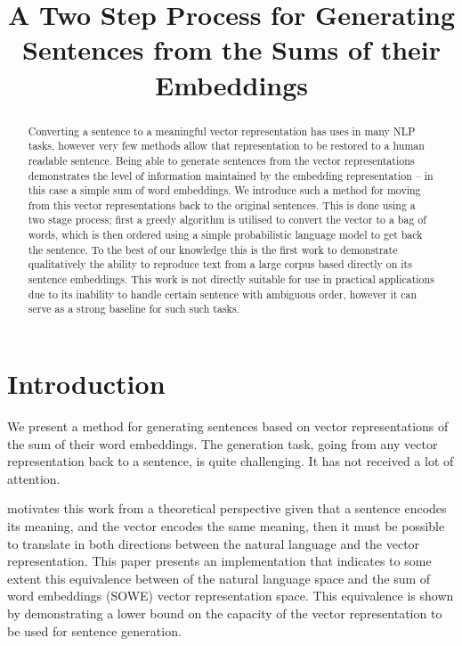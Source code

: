 \documentclass[11pt]{article}
\title{A Two Step Process for Generating Sentences from the Sums of their Embeddings}
\author{}
\theoremstyle{plain}
\theoremstyle{definition}
\newcommand{\textcite}{\protect\newcite}
\begin{document}
\maketitle

\begin{abstract}

	
Converting a sentence to a meaningful vector representation has uses in many NLP tasks, however very few methods allow that representation to be restored to a human readable sentence. Being able to generate sentences from the vector representations demonstrates the level of information maintained by the embedding representation -- in this case a simple sum of word embeddings. We introduce such a method for moving from this vector representations back to the original sentences. This is done using a two stage process; first a greedy algorithm is utilised to convert the vector to a bag of words, which is then ordered using a simple probabilistic language model to get back the sentence. To the best of our knowledge this is the first work to demonstrate qualitatively the ability to reproduce text from a large corpus based directly on its sentence embeddings. This work is not directly suitable for use in practical applications due to its inability to handle certain sentence with ambiguous order, however it can serve as a strong baseline for such such tasks.
\end{abstract}

\section{Introduction} \label{intro}
We present a method for generating sentences based on vector representations of the sum of their word embeddings. The generation task, going from any vector representation back to a sentence, is quite challenging. It has not received a lot of attention.

\textcite{Dinu2014CompositionalGeneration} motivates this work from a theoretical perspective given that a sentence encodes its meaning, and the vector encodes the same meaning, then it must be possible to translate in both directions between the natural language and the vector representation. This paper presents an implementation that indicates to some extent this equivalence between of the natural language space and the sum of word embeddings (SOWE) vector representation space. This equivalence is shown by demonstrating a lower bound on the capacity of the vector representation to be used for sentence generation. 
\end{document}
